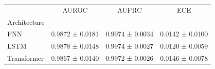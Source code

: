 \begin{tabular}{lccc}
 & AUROC & AUPRC & ECE \\
Architecture &  &  &  \\
FNN & 0.9872 ± 0.0181 & 0.9974 ± 0.0034 & 0.0142 ± 0.0100 \\
LSTM & 0.9878 ± 0.0148 & 0.9974 ± 0.0027 & 0.0120 ± 0.0059 \\
Transformer & 0.9867 ± 0.0140 & 0.9972 ± 0.0026 & 0.0146 ± 0.0078 \\
\end{tabular}
